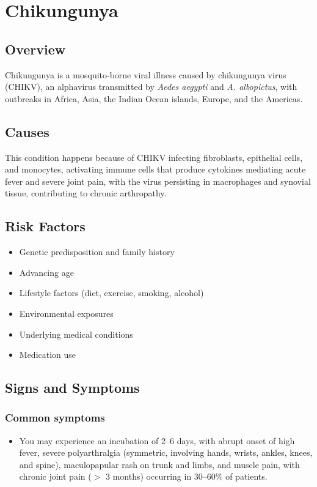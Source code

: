\chapter{Chikungunya}
\label{sec:Chikungunya}

\section{Overview}
Chikungunya is a mosquito-borne viral illness caused by chikungunya virus (CHIKV), an alphavirus transmitted by \textit{Aedes aegypti} and \textit{A. albopictus}, with outbreaks in Africa, Asia, the Indian Ocean islands, Europe, and the Americas.
\section{Causes}
This condition happens because of CHIKV infecting fibroblasts, epithelial cells, and monocytes, activating immune cells that produce cytokines mediating acute fever and severe joint pain, with the virus persisting in macrophages and synovial tissue, contributing to chronic arthropathy.     
\section{Risk Factors}

\begin{itemize}[noitemsep]
  \item Genetic predisposition and family history
  \item Advancing age
  \item Lifestyle factors (diet, exercise, smoking, alcohol)
  \item Environmental exposures
  \item Underlying medical conditions
  \item Medication use
\end{itemize}
\section{Signs and Symptoms}

\subsection{Common symptoms}
\begin{itemize}[noitemsep]
  \item You may experience an incubation of 2--6 days, with abrupt onset of high fever, severe polyarthralgia (symmetric, involving hands, wrists, ankles, knees, and spine), maculopapular rash on trunk and limbs, and muscle pain, with chronic joint pain ($>$ 3 months) occurring in 30--60\% of patients. 
  \end{itemize}

